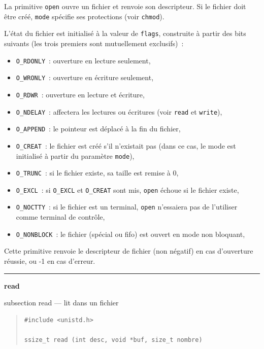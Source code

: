 \documentclass [twoside] {report}
\newcommand {\primitive} [1]
    {
	\phantomsection
	{\large \textbf {#1}}
	\addcontentsline {toc} {subsection} {#1}
    }
\newcommand {\separation}
    {
	\vspace {5mm}
	\nopagebreak
	\hrule
    }
\begin{document}
La primitive \texttt {open} ouvre un fichier et renvoie
son descripteur. Si le fichier doit être créé,
\texttt {mode} spécifie ses protections (voir \texttt {chmod}).

L'état du fichier est initialisé à la valeur de
\texttt {flags}, construite à partir des bits suivants
(les trois premiers sont mutuellement exclusifs)~:

\begin {itemize}
    \item \texttt {O\_RDONLY}~: ouverture en lecture seulement,
    \item \texttt {O\_WRONLY}~: ouverture en écriture seulement,
    \item \texttt {O\_RDWR}~: ouverture en lecture et écriture,
    \item \texttt {O\_NDELAY}~: affectera les lectures ou
	écritures (voir \texttt {read} et \texttt {write}),
    \item \texttt {O\_APPEND}~: le pointeur est déplacé à la fin du fichier,
    \item \texttt {O\_CREAT}~: le fichier est créé s'il n'existait pas
	(dans ce cas, le mode est initialisé à partir du paramètre \texttt {mode}),
    \item \texttt {O\_TRUNC}~: si le fichier existe, sa taille est remise à 0,
    \item \texttt {O\_EXCL}~: si \texttt {O\_EXCL} et \texttt {O\_CREAT} sont mis,
	\texttt {open} échoue si le fichier existe,
    \item \texttt {O\_NOCTTY}~: si le fichier est un terminal, \texttt {open}
	n'essaiera pas de l'utiliser comme terminal de contrôle,
    \item \texttt {O\_NONBLOCK}~: le fichier (spécial ou fifo) est ouvert en
	mode non bloquant,
\end {itemize}

Cette primitive renvoie le descripteur de fichier
(non négatif) en cas d'ouverture
réussie, ou -1 en cas d'erreur.




\separation
\primitive {read} --- lit dans un fichier

\begin {quote}
\begin {verbatim}
#include <unistd.h>

ssize_t read (int desc, void *buf, size_t nombre)
\end{verbatim}
\end {quote}
\end{document}
